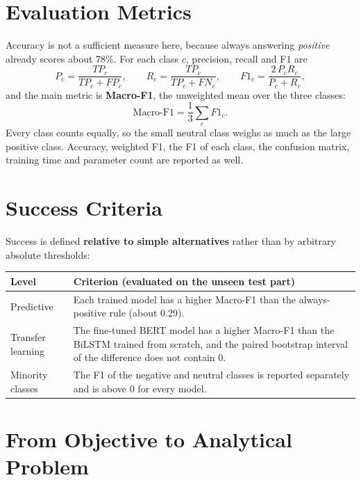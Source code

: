 \section{Evaluation Metrics}
\label{sec:2-4}

Accuracy is not a sufficient measure here, because always answering \emph{positive} already scores about 78\%. For each class $c$, precision, recall and F1 are
\begin{equation*}
    P_c = \frac{TP_c}{TP_c+FP_c},\qquad
    R_c = \frac{TP_c}{TP_c+FN_c},\qquad
    F1_c = \frac{2\,P_c R_c}{P_c+R_c},
\end{equation*}
and the main metric is \textbf{Macro-F1}, the unweighted mean over the three classes:
\begin{equation*}
    \text{Macro-F1} = \frac{1}{3}\sum_{c} F1_c .
\end{equation*}
Every class counts equally, so the small neutral class weighs as much as the large positive class. Accuracy, weighted F1, the F1 of each class, the confusion matrix, training time and parameter count are reported as well.

\section{Success Criteria}
\label{sec:2-5}

Success is defined \textbf{relative to simple alternatives} rather than by arbitrary absolute thresholds:

\begin{center}
\begin{tabular}{@{}p{3cm}p{11.5cm}@{}}
    \toprule
    Level & Criterion (evaluated on the unseen test part) \\
    \midrule
    Predictive & Each trained model has a higher Macro-F1 than the always-positive rule (about 0.29). \\
    Transfer learning & The fine-tuned BERT model has a higher Macro-F1 than the BiLSTM trained from scratch, and the paired bootstrap interval of the difference does not contain 0. \\
    Minority classes & The F1 of the negative and neutral classes is reported separately and is above 0 for every model. \\
    \bottomrule
\end{tabular}
\end{center}

\section{From Objective to Analytical Problem}
\label{sec:2-6}

